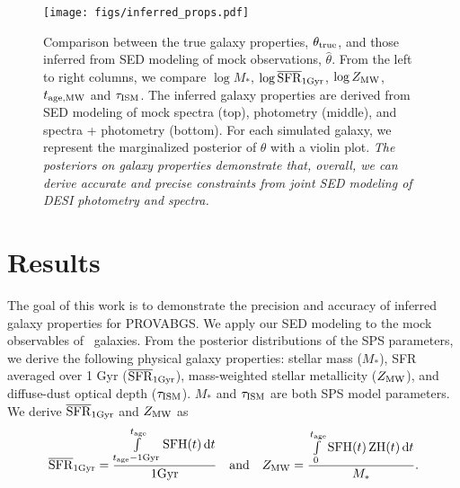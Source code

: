 \begin{figure}
\begin{center}
\texttt{[image: figs/inferred\_props.pdf]}
\caption{
    Comparison between the true galaxy properties, $\theta_{\rm true}$, and
    those inferred from SED modeling of mock observations, $\hat{\theta}$. 
    From the left to right columns, we compare $\log M_*$, $\log \overline{\rm SFR}_{\rm 1Gyr}$, 
    $\log Z_{\rm MW}$, $t_{\rm age, MW}$ and $\tau_{\rm ISM}$. 
    The inferred galaxy properties are derived from SED modeling of mock
    spectra (top), photometry (middle), and spectra + photometry (bottom). 
    For each simulated galaxy, we represent the marginalized posterior of
    $\theta$ with a violin plot.  %
    \emph{The posteriors on galaxy properties demonstrate that, overall, we can
    derive accurate and precise constraints from joint SED modeling of DESI
    photometry and spectra.}
    } \label{fig:prop_inf}
\end{center}
\end{figure}

\section{Results} \label{sec:results}
The goal of this work is to demonstrate the precision and accuracy of inferred
galaxy properties for PROVABGS. 
We apply our SED modeling to the mock observables of  \lgal~galaxies.
From the posterior distributions of the SPS parameters, we derive the following
physical galaxy properties: stellar mass ($M_*$), SFR averaged over 1 Gyr
($\overline{\rm SFR}_{\rm 1Gyr}$), mass-weighted stellar metallicity ($Z_{\rm MW}$), and diffuse-dust
optical depth ($\tau_{\rm ISM}$).
$M_*$ and $\tau_{\rm ISM}$ are both SPS model parameters. 
We derive $\overline{\rm SFR}_{\rm 1Gyr}$ and $Z_{\rm MW}$ as 
\begin{equation}
    \avgsfr = \frac{\int\limits_{t_{\rm age} - {\rm 1 Gyr}}^{t_{\rm age}}{\rm
    SFH}(t)\,{\rm d}t}{{\rm 1 Gyr}} \quad{\rm and}\quad
    Z_{\rm MW} = \frac{\int\limits_0^{t_{\rm age}}{\rm SFH}(t)\,{\rm
    ZH}(t)\,{\rm d}t}{M_*}.
\end{equation} 

